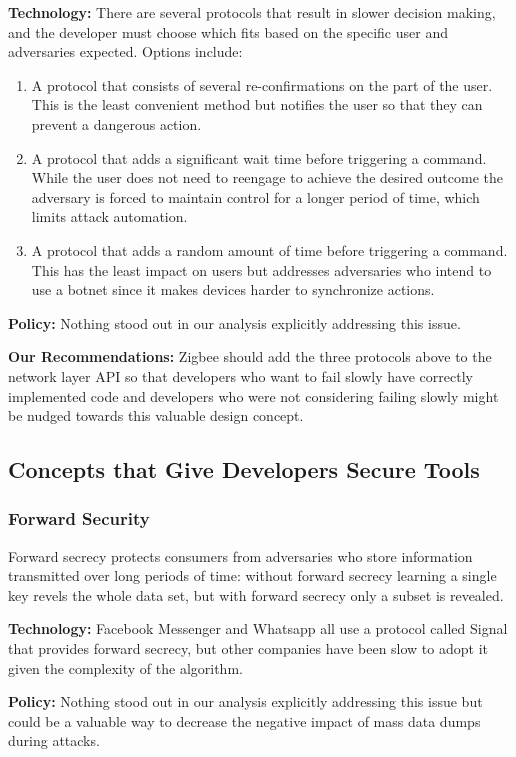 {\bf Technology:} There are several protocols that result in slower decision making, and the developer must choose which fits based on the specific user and adversaries expected. Options include:
\begin{enumerate}
\item A protocol that consists of several re-confirmations on the part of the user. This is the least convenient method but notifies the user so that they can prevent a dangerous action.
\item A protocol that adds a significant wait time before triggering a command. While the user does not need to reengage to achieve the desired outcome the adversary is forced to maintain control for a longer period of time, which limits attack automation.
\item A protocol that adds a random amount of time before triggering a command. This has the least impact on users but addresses adversaries who intend to use a botnet since it makes devices harder to synchronize actions.
\end{enumerate}


{\bf Policy:} Nothing stood out in our analysis explicitly addressing this issue.


{\bf Our Recommendations:}
Zigbee should add the three protocols above to the network layer API so that developers who want to fail slowly have correctly implemented code and developers who were not considering failing slowly might be nudged towards this valuable design concept.

\subsection{Concepts that Give Developers Secure Tools}
\subsubsection{Forward Security}
Forward secrecy protects consumers from adversaries who store information transmitted over long periods of time: without forward secrecy learning a single key revels the whole data set, but with forward secrecy only a subset is revealed. 


{\bf Technology:} Facebook Messenger and Whatsapp all use a protocol called Signal that provides forward secrecy, but other companies have been slow to adopt it given the complexity of the algorithm. 


{\bf Policy:} Nothing stood out in our analysis explicitly addressing this issue but could be a valuable way to decrease the negative impact of mass data dumps during attacks.


